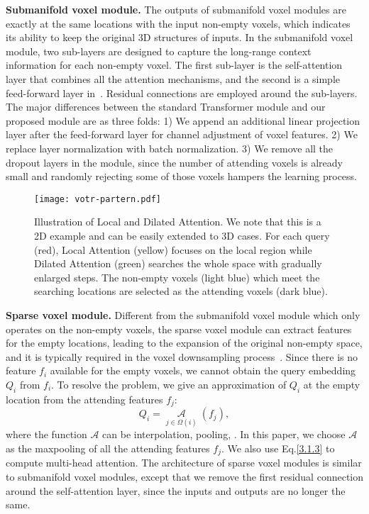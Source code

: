 \documentclass[10pt,twocolumn,letterpaper]{article}
\begin{document}
\textbf{Submanifold voxel module.} The outputs of submanifold voxel modules are exactly at the same locations with the input non-empty voxels, which indicates its ability to keep the original 3D structures of inputs. In the submanifold voxel module, two sub-layers are designed to capture the long-range context information for each non-empty voxel. The first sub-layer is the self-attention layer that combines all the attention mechanisms, and the second is a simple feed-forward layer in~\cite{vaswani2017attention}. Residual connections are employed around the sub-layers. The major differences between the standard Transformer module and our proposed module are as three folds: 1) We append an additional linear projection layer after the feed-forward layer for channel adjustment of voxel features. 2) We replace layer normalization with batch normalization. 3) We remove all the dropout layers in the module, since the number of attending voxels is already small and randomly rejecting some of those voxels hampers the learning process.

\begin{figure}[!t]
\centering
\texttt{[image: votr-partern.pdf]}
\caption{Illustration of Local and Dilated Attention. We note that this is a 2D example and can be easily extended to 3D cases. For each query (red), Local Attention (yellow) focuses on the local region while Dilated Attention (green) searches the whole space with gradually enlarged steps. The non-empty voxels (light blue) which meet the searching locations are selected as the attending voxels (dark blue).}
\label{fig_attention}
\end{figure}

\textbf{Sparse voxel module.} Different from the submanifold voxel module which only operates on the non-empty voxels, the sparse voxel module can extract features for the empty locations, leading to the expansion of the original non-empty space, and it is typically required in the voxel downsampling process~\cite{yan2018second}. Since there is no feature $f_{i}$ available for the empty voxels, we cannot obtain the query embedding $Q_{i}$ from $f_{i}$. To resolve the problem, we give an approximation of $Q_{i}$ at the empty location from the attending features $f_{j}$:
\begin{equation} \label{3.1.4}
    Q_{i} = \mathop{\mathcal{A}}\limits_{j \in \Omega(i)}(f_{j}),
\end{equation}
where the function $\mathcal{A}$ can be interpolation, pooling, \etc. In this paper, we choose $\mathcal{A}$ as the maxpooling of all the attending features $f_{j}$. We also use Eq.\ref{3.1.3} to compute multi-head attention. The architecture of sparse voxel modules is similar to submanifold voxel modules, except that we remove the first residual connection around the self-attention layer, since the inputs and outputs are no longer the same.
\end{document}
